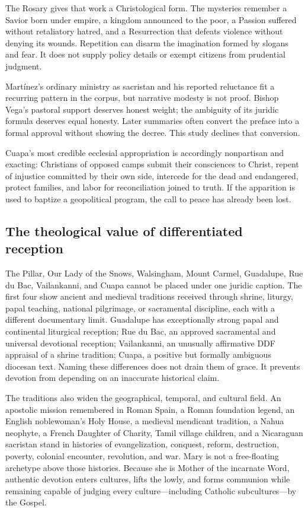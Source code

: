 The Rosary gives that work a Christological form. The mysteries remember a Savior born under empire, a kingdom announced to the poor, a Passion suffered without retaliatory hatred, and a Resurrection that defeats violence without denying its wounds. Repetition can disarm the imagination formed by slogans and fear. It does not supply policy details or exempt citizens from prudential judgment.

Martínez's ordinary ministry as sacristan and his reported reluctance fit a recurring pattern in the corpus, but narrative modesty is not proof. Bishop Vega's pastoral support deserves honest weight; the ambiguity of its juridic formula deserves equal honesty. Later summaries often convert the preface into a formal approval without showing the decree. This study declines that conversion.

Cuapa's most credible ecclesial appropriation is accordingly nonpartisan and exacting: Christians of opposed camps submit their consciences to Christ, repent of injustice committed by their own side, intercede for the dead and endangered, protect families, and labor for reconciliation joined to truth. If the apparition is used to baptize a geopolitical program, the call to peace has already been lost.

\subsection{The theological value of differentiated reception}

The Pillar, Our Lady of the Snows, Walsingham, Mount Carmel, Guadalupe, Rue du Bac, Vailankanni, and Cuapa cannot be placed under one juridic caption. The first four show ancient and medieval traditions received through shrine, liturgy, papal teaching, national pilgrimage, or sacramental discipline, each with a different documentary limit. Guadalupe has exceptionally strong papal and continental liturgical reception; Rue du Bac, an approved sacramental and universal devotional reception; Vailankanni, an unusually affirmative DDF appraisal of a shrine tradition; Cuapa, a positive but formally ambiguous diocesan text. Naming these differences does not drain them of grace. It prevents devotion from depending on an inaccurate historical claim.

The traditions also widen the geographical, temporal, and cultural field. An apostolic mission remembered in Roman Spain, a Roman foundation legend, an English noblewoman's Holy House, a medieval mendicant tradition, a Nahua neophyte, a French Daughter of Charity, Tamil village children, and a Nicaraguan sacristan stand in histories of evangelization, conquest, reform, destruction, poverty, colonial encounter, revolution, and war. Mary is not a free-floating archetype above those histories. Because she is Mother of the incarnate Word, authentic devotion enters cultures, lifts the lowly, and forms communion while remaining capable of judging every culture---including Catholic subcultures---by the Gospel.
